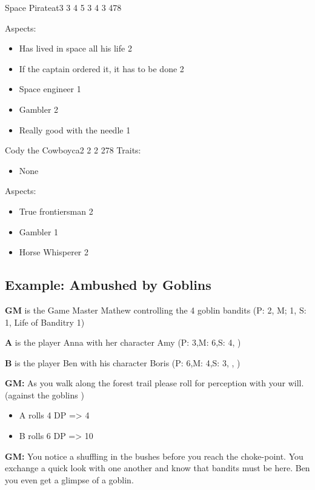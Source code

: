 \documentclass[11pt]{article}
\begin{document}
{\begin{npc}{Space Pirate}{at}{3 3 4 5 3 4 3 4}{78}
\columnbreak

Aspects:
\begin{itemize}
\item Has lived in space all his life 2
\item If the captain ordered it, it has to be done 2
\item Space engineer 1
\item Gambler 2
\item Really good with the needle 1
\end{itemize}
\end{npc}


\begin{npc}{Cody the Cowboy}{ca}{2 2 2 2}{78}
Traits:
\begin{itemize}
\item None
\end{itemize}

\columnbreak

Aspects:
\begin{itemize}
\item True frontiersman 2
\item Gambler 1
\item Horse Whisperer 2
\end{itemize}
\end{npc}
\subsection{Example: Ambushed by Goblins}
\label{sec:org4534686}

\textbf{GM} is the Game Master Mathew controlling the 4 goblin bandits (P: 2, M; 1, S: 1, Life of Banditry 1)

\textbf{A} is the player Anna with her character Amy (P: 3,M: 6,S: 4, )

\textbf{B} is the player Ben with his character Boris (P: 6,M: 4,S: 3, , )

\textbf{GM:} As you walk along the forest trail please roll for perception with your will. (against the goblins ) 
\begin{itemize}
\item A rolls 4 DP => 4
\item B rolls 6 DP => 10
\end{itemize}

\textbf{GM:} You notice a shuffling in the bushes before you reach the choke-point. You exchange a quick look with one another and know that bandits must be here. Ben you even get a glimpse of a goblin.

}
\end{document}
